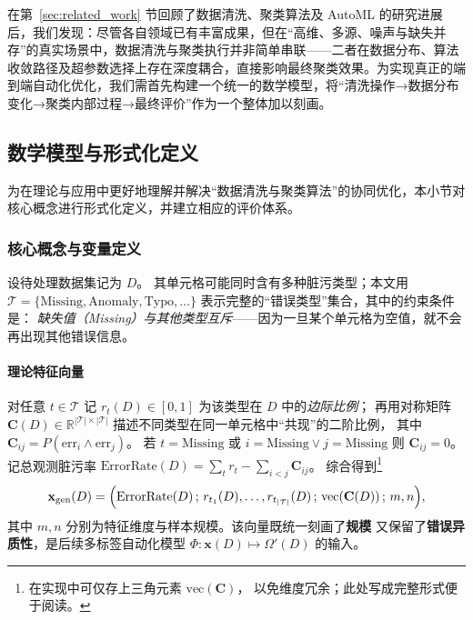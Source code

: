 \documentclass[10pt]{article} %
\numberwithin{equation}{section}
\begin{document}
\textcolor[rgb]{0.00,0.07,1.00}{}在第~\ref{sec:related_work} 节回顾了数据清洗、聚类算法及 AutoML 的研究进展后，我们发现：尽管各自领域已有丰富成果，但在“高维、多源、噪声与缺失并存”的真实场景中，数据清洗与聚类执行并非简单串联——二者在数据分布、算法收敛路径及超参数选择上存在深度耦合，直接影响最终聚类效果。为实现真正的端到端自动化优化，我们需首先构建一个统一的数学模型，将“清洗操作→数据分布变化→聚类内部过程→最终评价”作为一个整体加以刻画。


\subsection{数学模型与形式化定义}\label{subsec:formal-definition}

为在理论与应用中更好地理解并解决“数据清洗与聚类算法”的协同优化，本小节对核心概念进行形式化定义，并建立相应的评价体系。

\subsubsection{核心概念与变量定义}
\label{subsec:core-def}
设待处理数据集记为 \(D\)。  
其单元格可能同时含有多种脏污类型；本文用  
\(\mathcal{T}\!=\!\{\text{Missing},\text{Anomaly},\text{Typo},\dots\}\)  
表示完整的“错误类型”集合，其中的约束条件是：  
\emph{缺失值（Missing）与其他类型互斥}——因为一旦某个单元格为空值，就不会再出现其他错误信息。

\vspace{0.3em}
\paragraph{理论特征向量}
对任意 \(t\!\in\!\mathcal{T}\) 记
\(r_t(D)\in[0,1]\) 为该类型在 \(D\) 中的\emph{边际比例}；  
再用对称矩阵 \(\mathbf{C}(D)\in\mathbb{R}^{|\mathcal{T}|\times|\mathcal{T}|}\)  
描述不同类型在同一单元格中“共现”的二阶比例，
其中 \(\mathbf{C}_{ij}=P(\text{err}_i\land\text{err}_j)\)。
若 \(t=\text{Missing}\) 或 \(i=\text{Missing}\vee j=\text{Missing}\) 则  
\(\mathbf{C}_{ij}=0\)。记总观测脏污率
\(\mathrm{ErrorRate}(D)=\sum_{t}r_t-\sum_{i<j}\mathbf{C}_{ij}\)。  
综合得到\footnote{%
在实现中可仅存上三角元素 \(\mathrm{vec}(\mathbf{C})\)，
以免维度冗余；此处写成完整形式便于阅读。}  
\begin{equation}\label{eq:xD}
  \mathbf{x}_{\mathrm{gen}}(D)=
  \Bigl(
     \mathrm{ErrorRate}(D)\,;\,
     r_{t_1}(D),\ldots,r_{t_{|\mathcal{T}|}}(D)\,;\,
     \mathrm{vec}(\mathbf{C}(D))\,;\,
     m,n
  \Bigr),
\end{equation}
其中 \(m,n\) 分别为特征维度与样本规模。该向量既统一刻画了\textbf{规模}
又保留了\textbf{错误异质性}，是后续多标签自动化模型
\(\Phi:\mathbf{x}(D)\mapsto\Omega'(D)\) 的输入。
\end{document}
